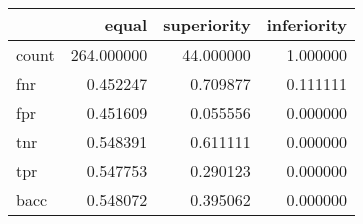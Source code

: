 \begin{tabular}{lrrr}
\toprule
{} &       equal &  superiority &  inferiority \\
\midrule
count &  264.000000 &    44.000000 &     1.000000 \\
fnr   &    0.452247 &     0.709877 &     0.111111 \\
fpr   &    0.451609 &     0.055556 &     0.000000 \\
tnr   &    0.548391 &     0.611111 &     0.000000 \\
tpr   &    0.547753 &     0.290123 &     0.000000 \\
bacc  &    0.548072 &     0.395062 &     0.000000 \\
\bottomrule
\end{tabular}
